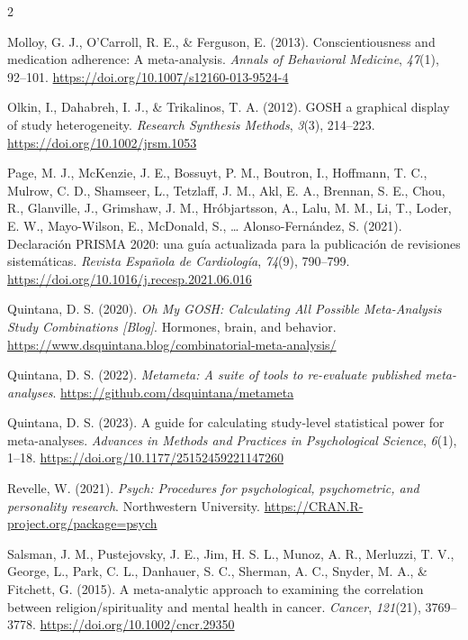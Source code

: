 \documentclass[
  bookmarksnumbered]{article}
\newlength{\cslhangindent}
\newlength{\cslentryspacingunit} %
\newenvironment{CSLReferences}[2] %
 {%
  \setlength{\parindent}{0pt}
  \ifodd #1
  \let\oldpar\par
  \def\par{\hangindent=\cslhangindent\oldpar}
  \fi
  \setlength{\parskip}{#2\cslentryspacingunit}
 }%
 {}
\begin{document}
\begin{multicols}{2}
\begin{CSLReferences}{1}{0}
\leavevmode{}%
Molloy, G. J., O'Carroll, R. E., \& Ferguson, E. (2013). Conscientiousness and medication adherence: A meta-analysis. \emph{Annals of Behavioral Medicine}, \emph{47}(1), 92--101. \url{https://doi.org/10.1007/s12160-013-9524-4}

\leavevmode{}%
Olkin, I., Dahabreh, I. J., \& Trikalinos, T. A. (2012). {GOSH} \textendash{} a graphical display of study heterogeneity. \emph{Research Synthesis Methods}, \emph{3}(3), 214--223. \url{https://doi.org/10.1002/jrsm.1053}

\leavevmode{}%
Page, M. J., McKenzie, J. E., Bossuyt, P. M., Boutron, I., Hoffmann, T. C., Mulrow, C. D., Shamseer, L., Tetzlaff, J. M., Akl, E. A., Brennan, S. E., Chou, R., Glanville, J., Grimshaw, J. M., Hróbjartsson, A., Lalu, M. M., Li, T., Loder, E. W., Mayo-Wilson, E., McDonald, S., \ldots{} Alonso-Fernández, S. (2021). {Declaración PRISMA 2020: una guía actualizada para la publicación de revisiones sistemáticas}. \emph{Revista Española de Cardiología}, \emph{74}(9), 790--799. \url{https://doi.org/10.1016/j.recesp.2021.06.016}

\leavevmode{}%
Quintana, D. S. (2020). \emph{{Oh My GOSH: Calculating All Possible Meta-Analysis Study Combinations} \emph{{[}{B}log{]}}}. {Hormones, brain, and behavior.} \url{https://www.dsquintana.blog/combinatorial-meta-analysis/}

\leavevmode{}%
Quintana, D. S. (2022). \emph{Metameta: A suite of tools to re-evaluate published meta-analyses}. \url{https://github.com/dsquintana/metameta}

\leavevmode{}%
Quintana, D. S. (2023). A guide for calculating study-level statistical power for meta-analyses. \emph{{Advances in Methods and Practices in Psychological Science}}, \emph{6}(1), 1--18. \url{https://doi.org/10.1177/25152459221147260}

\leavevmode{}%
Revelle, W. (2021). \emph{Psych: Procedures for psychological, psychometric, and personality research}. Northwestern University. \url{https://CRAN.R-project.org/package=psych}

\leavevmode{}%
Salsman, J. M., Pustejovsky, J. E., Jim, H. S. L., Munoz, A. R., Merluzzi, T. V., George, L., Park, C. L., Danhauer, S. C., Sherman, A. C., Snyder, M. A., \& Fitchett, G. (2015). A meta-analytic approach to examining the correlation between religion/spirituality and mental health in cancer. \emph{Cancer}, \emph{121}(21), 3769--3778. \url{https://doi.org/10.1002/cncr.29350}


\end{CSLReferences}
\end{multicols}
\end{document}
